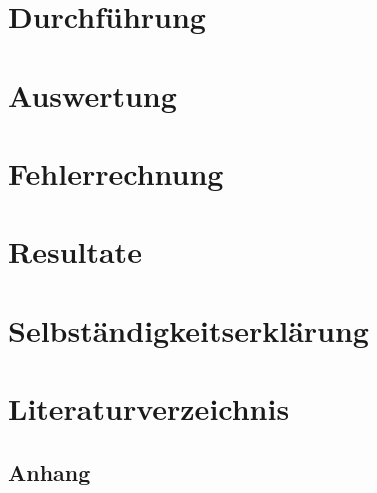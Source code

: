 \documentclass[10pt,a4paper,oneside]{article}
\begin{document}
\section{Durchführung}\label{sec:durchführung}

\clearpage

\section{Auswertung}\label{sec:auswertung}

\clearpage

\section{Fehlerrechnung}\label{sec:fehlerrechnung}

\clearpage

\section{Resultate}\label{sec:resultate}

\clearpage

\section{Selbständigkeitserklärung}\label{sec:selbständigkeitserklärung}

\clearpage

\section{Literaturverzeichnis}\label{sec:literaturverzeichnis}

\clearpage

\begin{appendix}
\section{Anhang}\label{sec:appendix}

\end{appendix}
\end{document}
